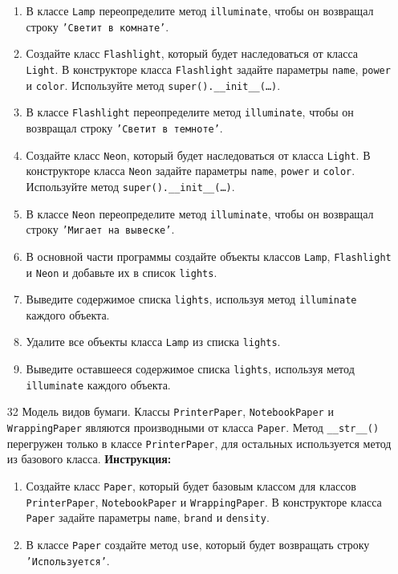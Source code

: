 \begin{enumerate}
\begin{enumerate}
    \item В классе \texttt{Lamp} переопределите метод \texttt{illuminate}, чтобы он возвращал строку \texttt{'Светит в комнате'}.
    \item Создайте класс \texttt{Flashlight}, который будет наследоваться от класса \texttt{Light}. В конструкторе класса \texttt{Flashlight} задайте параметры \texttt{name}, \texttt{power} и \texttt{color}. Используйте метод \texttt{super().\_\_init\_\_(\ldots)}.
    \item В классе \texttt{Flashlight} переопределите метод \texttt{illuminate}, чтобы он возвращал строку \texttt{'Светит в темноте'}.
    \item Создайте класс \texttt{Neon}, который будет наследоваться от класса \texttt{Light}. В конструкторе класса \texttt{Neon} задайте параметры \texttt{name}, \texttt{power} и \texttt{color}. Используйте метод \texttt{super().\_\_init\_\_(\ldots)}.
    \item В классе \texttt{Neon} переопределите метод \texttt{illuminate}, чтобы он возвращал строку \texttt{'Мигает на вывеске'}.
    \item В основной части программы создайте объекты классов \texttt{Lamp}, \texttt{Flashlight} и \texttt{Neon} и добавьте их в список \texttt{lights}.
    \item Выведите содержимое списка \texttt{lights}, используя метод \texttt{illuminate} каждого объекта.
    \item Удалите все объекты класса \texttt{Lamp} из списка \texttt{lights}.
    \item Выведите оставшееся содержимое списка \texttt{lights}, используя метод \texttt{illuminate} каждого объекта.
\end{enumerate}
\item[32]
Модель видов бумаги. Классы \texttt{PrinterPaper}, \texttt{NotebookPaper} и \texttt{WrappingPaper} являются производными от класса \texttt{Paper}. Метод \texttt{\_\_str\_\_()} перегружен только в классе \texttt{PrinterPaper}, для остальных используется метод из базового класса.
\textbf{Инструкция:}
\begin{enumerate}
    \item Создайте класс \texttt{Paper}, который будет базовым классом для классов \texttt{PrinterPaper}, \texttt{NotebookPaper} и \texttt{WrappingPaper}. В конструкторе класса \texttt{Paper} задайте параметры \texttt{name}, \texttt{brand} и \texttt{density}.
    \item В классе \texttt{Paper} создайте метод \texttt{use}, который будет возвращать строку \texttt{'Используется'}.

\end{enumerate}
\end{enumerate}
